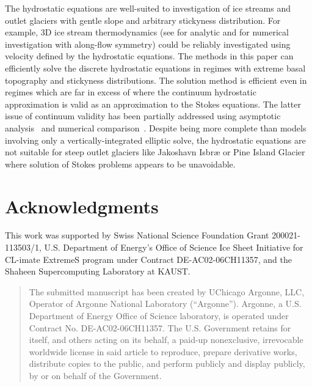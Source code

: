 \documentclass[draft,lineno,jgrga]{AGUTeX}
\begin{document}
\begin{article}
The hydrostatic equations are well-suited to investigation of ice streams and outlet glaciers with gentle slope and arbitrary stickyness distribution.
For example, 3D ice stream thermodynamics (see \cite{raymond2000energy} for analytic and \cite{truffer2003isbrae} for numerical investigation with along-flow symmetry) could be reliably investigated using velocity defined by the hydrostatic equations.
The methods in this paper can efficiently solve the discrete hydrostatic equations in regimes with extreme basal topography and stickyness distributions.
The solution method is efficient even in regimes which are far in excess of where the continuum hydrostatic approximation is valid as an approximation to the Stokes equations.
The latter issue of continuum validity has been partially addressed using asymptotic analysis~\citep{schoof2010thin} and numerical comparison~\citep{hindmarsh2004numerical,pattyn2008beh}.
Despite being more complete than models involving only a vertically-integrated elliptic solve, the hydrostatic equations are not suitable for steep outlet glaciers like Jakoshavn Isbr{\ae} or Pine Island Glacier where solution of Stokes problems appears to be unavoidable.

\section*{Acknowledgments}
This work was supported by Swiss National Science Foundation Grant 200021-113503/1, U.S. Department of Energy's Office of Science Ice Sheet Initiative for CL-imate ExtremeS program under Contract DE-AC02-06CH11357, and the Shaheen Supercomputing Laboratory at KAUST.




\bigskip
\begin{quotation}
The submitted manuscript has been created by UChicago Argonne, LLC,
Operator of Argonne National Laboratory (``Argonne'').  Argonne, a
U.S. Department of Energy Office of Science laboratory, is operated
under Contract No. DE-AC02-06CH11357.  The U.S. Government retains for
itself, and others acting on its behalf, a paid-up nonexclusive,
irrevocable worldwide license in said article to reproduce, prepare
derivative works, distribute copies to the public, and perform
publicly and display publicly, by or on behalf of the Government.
\end{quotation}

\end{article}
\end{document}

